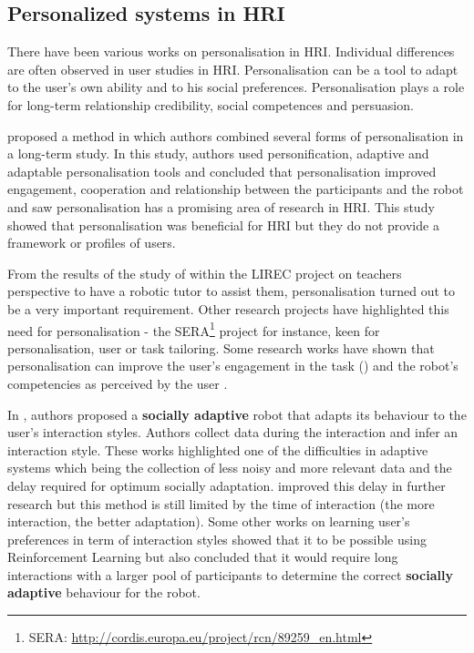 \documentclass[a4paper,twocolumn]{svjour3}
\begin{document}
\subsection{Personalized systems in HRI}
There have been various works on personalisation in HRI. 
Individual differences are often observed in user studies in HRI. 
Personalisation can be a tool to adapt to the user's own ability and to his social preferences.
Personalisation plays a role for long-term relationship credibility, social competences and persuasion. 

\cite{Lee2012} proposed a method in which authors combined several forms of personalisation in a long-term study. 
In this study, authors used personification, adaptive and adaptable personalisation tools and concluded that personalisation improved engagement, cooperation and relationship between the participants and the robot and saw personalisation has a promising area of research in HRI. 
This study showed that personalisation was beneficial for HRI but they do not provide a framework or profiles of users. 

From the results of the study of \cite{Jones2013} within the LIREC project on teachers perspective to have a robotic tutor to assist them, personalisation turned out to be a very important requirement. 
Other research projects have highlighted this need for personalisation - the SERA\footnote{SERA: \url{http://cordis.europa.eu/project/rcn/89259_en.html}} project for instance, keen for personalisation, user or task tailoring. 
Some research works have shown that personalisation can improve the user's engagement in the task (\cite{Corrigan2013}) and the robot's competencies as perceived  by the user \cite{Fasola2012a}.


In \cite{Francois2007a}, authors proposed a \textbf{socially adaptive} robot that adapts its behaviour to the user's interaction styles. Authors collect data during the interaction and infer an interaction style. 
These works highlighted one of the difficulties in adaptive systems which being the collection of less noisy and more relevant data and the delay required for optimum socially adaptation. 
\cite{Francois2009a} improved this delay in further research but this method is still limited by the time of interaction (the more interaction, the better adaptation). 
Some other works \cite{Castro-Gonzalez2011} on learning user's preferences in term of interaction styles showed that it to be possible using Reinforcement Learning but also concluded that it would require long interactions with a larger pool of participants to determine the correct \textbf{socially adaptive} behaviour for the robot. 
\end{document}
